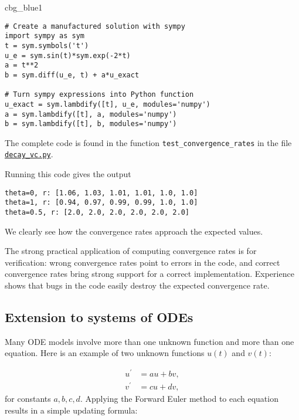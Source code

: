 \documentclass[graybox,sectrefs,envcountresetchap,open=right,final]{svmonodo}
\newenvironment{_cod_tight}[1]{
   \def\FrameCommand{\colorbox{#1}}
   \FrameRule0.6pt\MakeFramed {\FrameRestore}\vskip3mm}
   {\vskip0mm\endMakeFramed}
\newenvironment{cod}[1]{
\bgroup\rmfamily
\fboxsep=0mm\relax
\begin{_cod_tight}{#1}
\list{}{\parsep=-2mm\parskip=0mm\topsep=0pt\leftmargin=2mm
\rightmargin=2\leftmargin\leftmargin=4pt\relax}
\item\relax}
{\endlist\end{_cod_tight}\egroup}
\newenvironment{notice_mdfboxadmon}[1][]{
\begin{notice_mdfboxmdframed}[frametitle=#1]
}
{
\end{notice_mdfboxmdframed}
}
\begin{document}
\begin{cod}{cbg_blue1}\begin{Verbatim}[numbers=none,fontsize=\fontsize{9pt}{9pt},baselinestretch=0.95,xleftmargin=2mm]
# Create a manufactured solution with sympy
import sympy as sym
t = sym.symbols('t')
u_e = sym.sin(t)*sym.exp(-2*t)
a = t**2
b = sym.diff(u_e, t) + a*u_exact

# Turn sympy expressions into Python function
u_exact = sym.lambdify([t], u_e, modules='numpy')
a = sym.lambdify([t], a, modules='numpy')
b = sym.lambdify([t], b, modules='numpy')
\end{Verbatim}
\end{cod}
\noindent
The complete code is found in the function \Verb!test_convergence_rates!
in the file \href{{http://tinyurl.com/ofkw6kc/genz/decay_vc.py}}{\nolinkurl{decay_vc.py}}.

Running this code gives the output

\begin{Verbatim}[frame=lines,label=\fbox{{\tiny Terminal}},framesep=2.5mm,framerule=0.7pt,fontsize=\fontsize{9pt}{9pt}]
theta=0, r: [1.06, 1.03, 1.01, 1.01, 1.0, 1.0]
theta=1, r: [0.94, 0.97, 0.99, 0.99, 1.0, 1.0]
theta=0.5, r: [2.0, 2.0, 2.0, 2.0, 2.0, 2.0]
\end{Verbatim}
We clearly see how the convergence rates approach the expected values.



\begin{notice_mdfboxadmon}
The strong practical application of computing convergence rates is for
verification: wrong convergence rates point to errors in the code, and
correct convergence rates bring strong support for a correct implementation.
Experience shows that bugs in the code easily destroy the
expected convergence rate.
\end{notice_mdfboxadmon}





\subsection{Extension to systems of ODEs}

Many ODE models involve more than one unknown function and more
than one equation. Here is an example of two unknown functions $u(t)$
and $v(t)$:

\begin{align}
u^{\prime} &= a u + bv,\\ 
v^{\prime} &= cu +  dv,
\end{align}
for constants $a,b,c,d$.
Applying the Forward Euler method to each equation results in a simple
updating formula:
\end{document}
